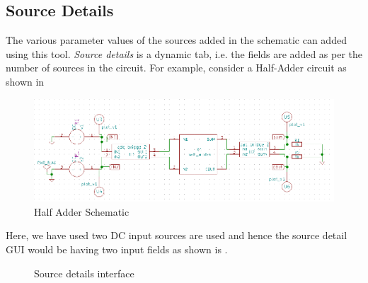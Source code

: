 \subsection {Source Details} \label{source}
The various parameter values of the sources added in the schematic can added using this tool. \textit {Source details} is a dynamic tab, i.e. the fields are added as per the number of sources in the circuit. For example, consider a Half-Adder circuit as shown in 
\begin{figure}
\centering
\includegraphics[width=\lgfig]{manual_images/half-adder.png}
\caption{Half Adder Schematic}
\label{halfschematic}
\end{figure}
Here, we have used two DC input sources are used and hence the source detail GUI would be having two input fields as shown is .

\begin{figure}[h]
\centering
{} \hfill
{} \hfill
\caption{Source details interface}
\end{figure}

